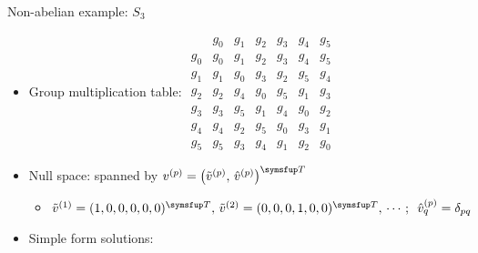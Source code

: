 \documentclass{fdubeamer}
\begin{document}
\begin{frame}{Non-abelian example: \texorpdfstring{$S_3$}{𝑆₃}}

\begin{itemize}
  \item Group multiplication table:
    \begingroup
      \tiny
      \setlength{\arraycolsep}{4pt}
      $
        \begin{array}{c|cccccc}
          & g_0 & g_1 & g_2 & g_3 & g_4 & g_5 \\
          \hline
          g_0 & g_0 & g_1 & g_2 & g_3 & g_4 & g_5 \\
          g_1 & g_1 & g_0 & g_3 & g_2 & g_5 & g_4 \\
          g_2 & g_2 & g_4 & g_0 & g_5 & g_1 & g_3 \\
          g_3 & g_3 & g_5 & g_1 & g_4 & g_0 & g_2 \\
          g_4 & g_4 & g_2 & g_5 & g_0 & g_3 & g_1 \\
          g_5 & g_5 & g_3 & g_4 & g_1 & g_2 & g_0
        \end{array}
      $
    \endgroup
  \item Null space: spanned by $v^{(p)}=\bigl( \tilde{v}^{(p)}, \, \hat{v}^{(p)} \bigr)^\trans$

    \begin{itemize}
      \item $\tilde{v}^{(1)}=(1,0,0,0,0,0)^\trans, \, \tilde{v}^{(2)}=(0,0,0,1,0,0)^\trans, \, \cdots; \enspace \hat{v}^{(p)}_q=\delta_{pq}$
    \end{itemize}

  \item Simple form solutions:


\end{itemize}
\end{frame}
\end{document}
